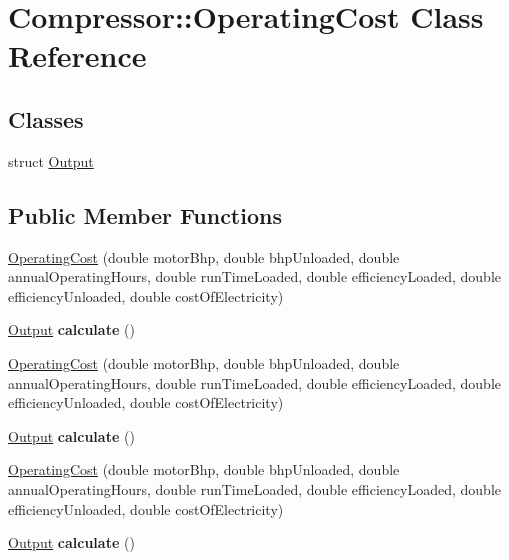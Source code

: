 \hypertarget{class_compressor_1_1_operating_cost}{}\section{Compressor\+:\+:Operating\+Cost Class Reference}
\label{class_compressor_1_1_operating_cost}
\subsection*{Classes}
\begin{DoxyCompactItemize}
\item 
struct \hyperlink{struct_compressor_1_1_operating_cost_1_1_output}{Output}
\end{DoxyCompactItemize}
\subsection*{Public Member Functions}
\begin{DoxyCompactItemize}
\item 
\hyperlink{class_compressor_1_1_operating_cost_aa5b9c984494fdfc08e31c2b7333f3657}{Operating\+Cost} (double motor\+Bhp, double bhp\+Unloaded, double annual\+Operating\+Hours, double run\+Time\+Loaded, double efficiency\+Loaded, double efficiency\+Unloaded, double cost\+Of\+Electricity)
\item 
\mbox{\label{class_compressor_1_1_operating_cost_a9778e1b3ed4a46d3f463032879fb8933}} 
\hyperlink{struct_compressor_1_1_operating_cost_1_1_output}{Output} {\bfseries calculate} ()
\item 
\hyperlink{class_compressor_1_1_operating_cost_aa5b9c984494fdfc08e31c2b7333f3657}{Operating\+Cost} (double motor\+Bhp, double bhp\+Unloaded, double annual\+Operating\+Hours, double run\+Time\+Loaded, double efficiency\+Loaded, double efficiency\+Unloaded, double cost\+Of\+Electricity)
\item 
\mbox{\label{class_compressor_1_1_operating_cost_a52c75f5612a724f611b5578cccc4aed5}} 
\hyperlink{struct_compressor_1_1_operating_cost_1_1_output}{Output} {\bfseries calculate} ()
\item 
\hyperlink{class_compressor_1_1_operating_cost_aa5b9c984494fdfc08e31c2b7333f3657}{Operating\+Cost} (double motor\+Bhp, double bhp\+Unloaded, double annual\+Operating\+Hours, double run\+Time\+Loaded, double efficiency\+Loaded, double efficiency\+Unloaded, double cost\+Of\+Electricity)
\item 
\mbox{\label{class_compressor_1_1_operating_cost_a52c75f5612a724f611b5578cccc4aed5}} 
\hyperlink{struct_compressor_1_1_operating_cost_1_1_output}{Output} {\bfseries calculate} ()
\end{DoxyCompactItemize}


